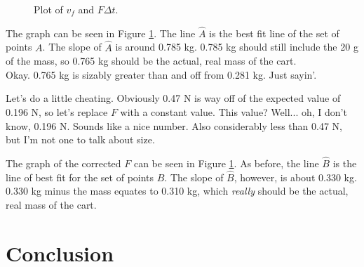 \documentclass[twocolumn]{article}
\begin{document}
\begin{figure}[h]
    \centering
    \caption{Plot of $v_f$ and $F \Delta t$.}
    \label{fig:graph}
\end{figure}

The graph can be seen in Figure \ref{fig:graph}. The line $\hat{A}$ is the best
fit line of the set of points $A$. The slope of $\hat{A}$ is around 0.785 kg.
0.785 kg should still include the 20 g of the mass, so 0.765 kg should be the
actual, real mass of the cart. \\

\noindent Okay. 0.765 kg is sizably greater than and off from 0.281 kg. Just
sayin'.

Let's do a little cheating. Obviously 0.47 N is way off of the expected value of
0.196 N, so let's replace $F$ with a constant value. This value? Well... oh, I
don't know, 0.196 N. Sounds like a nice number. Also considerably less than 0.47
N, but I'm not one to talk about size.

The graph of the corrected $F$ can be seen in Figure \ref{fig:graph}. As before,
the line $\hat{B}$ is the line of best fit for the set of points $B$. The slope
of $\hat{B}$, however, is about 0.330 kg. 0.330 kg minus the mass equates to
0.310 kg, which \emph{really} should be the actual, real mass of the cart.

\section{Conclusion} \label{sec:conclusion}
\end{document}
